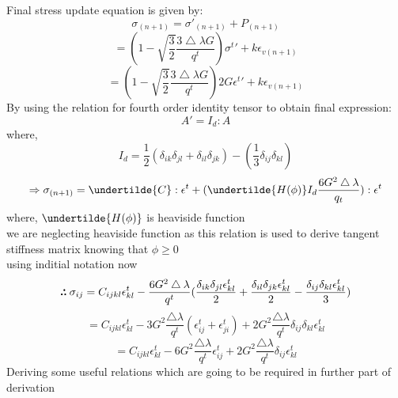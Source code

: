 \documentclass{article}
\def\therefore{\boldsymbol{\text{ }
\leavevmode
\lower0.4ex\hbox{$\cdot$}
\kern-.4em\raise0.5ex\hbox{$\cdot$}
\kern-0.55em\lower0.4ex\hbox{$\cdot$}
\thinspace\text{ }}}
\begin{document}
\pagebreak
Final stress update equation is given by:
\begin{equation}
    \sigma_{(n+1)}=\sigma\prime_{(n+1)} + P_{(n+1)}
\end{equation}
\begin{equation}
    = (1-\sqrt{\frac{3}{2}} \frac{3\bigtriangleup\lambda G}{q^{t}})  \sigma^{t}\prime + k\epsilon_{v(n+1)}
\end{equation}
\begin{equation}
    =(1-\sqrt{\frac{3}{2}} \frac{3\bigtriangleup\lambda G}{q^{t}})2G \epsilon^{t}\prime +k\epsilon_{v(n+1)}
\end{equation}
By using the relation for fourth order identity tensor to obtain final expression:
\begin{equation}
    A\prime = I_{d}: A
\end{equation}
where,
\begin{equation}
    I_{d}=\frac{1}{2}(\delta_{ik}\delta_{jl}+\delta_{il}\delta_{jk})-(\frac{1}{3}\delta_{ij}\delta_{kl})
\end{equation}
\begin{equation}
    \Rightarrow \sigma_{(n+1)}=\undertilde{C}:\epsilon^{t} + (\undertilde{H(\phi)}I_{d}\frac{6G^{2} \bigtriangleup\lambda}{q_{t}}):\epsilon^{t}
\end{equation}
where, $\undertilde{H(\phi)}$ is heaviside function\\
we are neglecting heaviside function as this relation is used to derive tangent stiffness matrix knowing that $\phi \geq 0$\\
using inditial notation now
\begin{equation}
    \therefore \sigma_{ij}= C_{ijkl}\epsilon^{t}_{kl} -\frac{6G^{2} \bigtriangleup\lambda}{q^{t}}(\frac{\delta_{ik}\delta_{jl} \epsilon^{t}_{kl}}{2} +\frac{\delta_{il}\delta_{jk} \epsilon^{t}_{kl}}{2}- \frac{\delta_{ij}\delta_{kl} \epsilon^{t}_{kl}}{3})
\end{equation}
\begin{equation}
    = C_{ijkl}\epsilon^{t}_{kl} -3G^{2}\frac{\bigtriangleup\lambda}{q^{t}}(\epsilon^{t}_{ij}+\epsilon^{t}_{ji}) +2G^{2}\frac{\bigtriangleup\lambda}{q^{t}}\delta_{ij}\delta_{kl}\epsilon^{t}_{kl}
\end{equation}
\begin{equation}
    = C_{ijkl}\epsilon^{t}_{kl}-6G^{2}\frac{\bigtriangleup\lambda}{q^{t}}\epsilon^{t}_{ij}+2G^{2}\frac{\bigtriangleup\lambda}{q^{t}}\delta_{ij}\epsilon^{t}_{kl}
\end{equation}
Deriving some useful relations which are going to be required in further part of derivation
\end{document}
